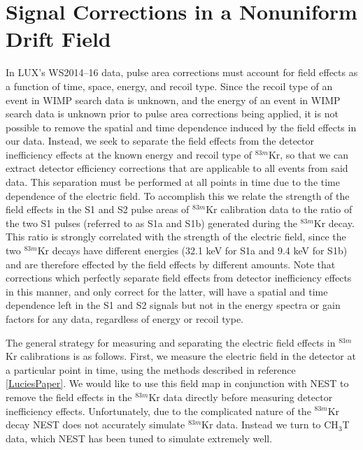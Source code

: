 
\section{Signal Corrections in a Nonuniform Drift Field}\label{section:GenStrat}

In LUX's WS2014–16 data, pulse area corrections must account for field effects as a function of time, space, energy, and recoil type.  Since the recoil type of an event in WIMP search data is unknown, and the energy of an event in WIMP search data is unknown prior to pulse area corrections being applied, it is not possible to remove the spatial and time dependence induced by the field effects in our data.  Instead, we seek to separate the field effects from the detector inefficiency effects at the known energy and recoil type of $^{83m}$Kr, so that we can extract detector efficiency corrections that are applicable to all events from said data.  This separation must be performed at all points in time due to the time dependence of the electric field.  To accomplish this we relate the strength of the field effects in the S1 and S2 pulse areas of $^{83m}$Kr calibration data to the ratio of the two S1 pulses (referred to as S1a and S1b) generated during the $^{83m}$Kr decay.  This ratio is strongly correlated with the strength of the electric field, since the two $^{83m}$Kr decays have different energies (32.1 keV for S1a and 9.4 keV for S1b) and are therefore effected by the field effects by different amounts.  Note that corrections which perfectly separate field effects from detector inefficiency effects in this manner, and only correct for the latter, will have a spatial and time dependence left in the S1 and S2 signals but not in the energy spectra or gain factors for any data, regardless of energy or recoil type.

The general strategy for measuring and separating the electric field effects in $^{83m}$Kr calibrations is as follows.  First, we measure the electric field in the detector at a particular point in time, using the methods described in reference \ref{LuciesPaper}.  We would like to use this field map in conjunction with NEST to remove the field effects in the $^{83m}$Kr data directly before measuring detector inefficiency effects.  Unfortunately, due to the complicated nature of the $^{83m}$Kr decay NEST does not accurately simulate $^{83m}$Kr data.  Instead we turn to CH$_3$T data, which NEST has been tuned to simulate extremely well.  

